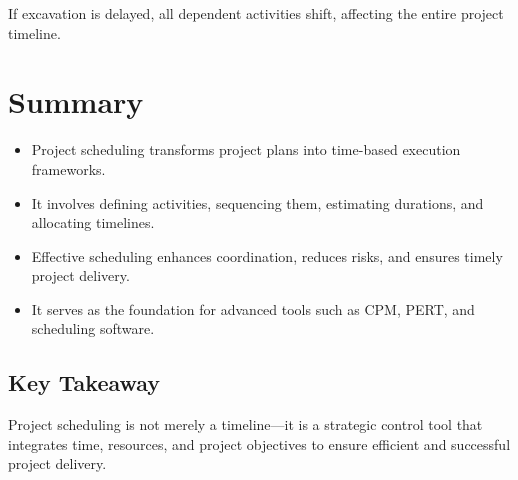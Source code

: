 \documentclass[12pt,a4paper]{article}
\begin{document}
If excavation is delayed, all dependent activities shift, affecting the entire project timeline.

\section*{Summary}
\begin{itemize}
    \item Project scheduling transforms project plans into time-based execution frameworks.
    \item It involves defining activities, sequencing them, estimating durations, and allocating timelines.
    \item Effective scheduling enhances coordination, reduces risks, and ensures timely project delivery.
    \item It serves as the foundation for advanced tools such as CPM, PERT, and scheduling software.
\end{itemize}

\subsection*{Key Takeaway}
Project scheduling is not merely a timeline—it is a strategic control tool that integrates time, resources, and project objectives to ensure efficient and successful project delivery.
\end{document}
